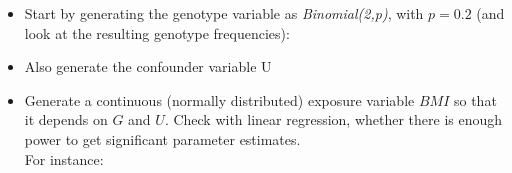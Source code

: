 \documentclass[
]{book}
\newenvironment{Shaded}{\begin{snugshade}}{\end{snugshade}}
\newcommand{\AttributeTok}[1]{\textcolor[rgb]{0.13,0.29,0.53}{#1}}
\newcommand{\DecValTok}[1]{\textcolor[rgb]{0.00,0.00,0.81}{#1}}
\newcommand{\FloatTok}[1]{\textcolor[rgb]{0.00,0.00,0.81}{#1}}
\newcommand{\FunctionTok}[1]{\textcolor[rgb]{0.13,0.29,0.53}{\textbf{#1}}}
\newcommand{\NormalTok}[1]{#1}
\newcommand{\OtherTok}[1]{\textcolor[rgb]{0.56,0.35,0.01}{#1}}
\newcommand{\SpecialCharTok}[1]{\textcolor[rgb]{0.81,0.36,0.00}{\textbf{#1}}}
\providecommand{\tightlist}{%
  \setlength{\itemsep}{0pt}\setlength{\parskip}{0pt}}
\begin{document}
\begin{itemize}
\tightlist
\item
  Start by generating the genotype variable as \emph{Binomial(2,p)}, with \(p=0.2\) (and look at the resulting genotype frequencies):
\end{itemize}

\begin{Shaded}
\end{Shaded}

\begin{itemize}
\tightlist
\item
  Also generate the confounder variable U
\end{itemize}

\begin{Shaded}
\end{Shaded}

\begin{itemize}
\tightlist
\item
  Generate a continuous (normally distributed) exposure variable \(BMI\) so that it depends on \(G\) and \(U\). Check with linear regression, whether there is enough power to get significant parameter estimates.\\
  For instance:
\end{itemize}

\begin{Shaded}
\end{Shaded}
\end{document}
